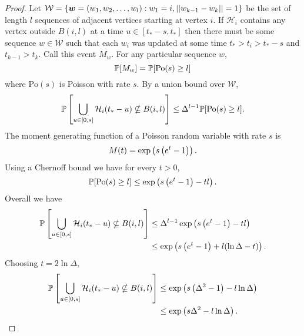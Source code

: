 		\begin{proof}
			Let $\mathcal{W} = \{{\bm{{w}}} = (w_1, w_2, \dots, w_l) : w_1 = i, ||w_{k-1} - w_k|| = 1\}$ be the set of length $l$ sequences of adjacent vertices starting at vertex $i$. If $\mathcal{H}_i$ contains any vertex outside $B(i, l)$ at a time $u \in [t_* - s, t_*]$ then there must be some sequence $w \in \mathcal{W}$ such that each $w_i$ was updated at some time $t_* > t_i > t_* - s$ and $t_{k-1} > t_k$. Call this event $M_w$. For any particular sequence $w$,
			\begin{equation}
				\mathbb{P}[M_w] = \mathbb{P}[\mathrm{Po}(s) \geq l]
			\end{equation}
			where $\mathrm{Po}(s)$ is Poisson with rate $s$. By a union bound over $\mathcal{W}$,
			\begin{equation}
				\mathbb{P}\left[\bigcup_{u \in [0, s]}\mathcal{H}_i(t_* - u) \nsubseteq B(i, l)\right] \leq \Delta^{l-1} \mathbb{P}[\mathrm{Po}(s) \geq l].
			\end{equation}
			The moment generating function of a Poisson random variable with rate $s$ is
			\begin{equation}
				M(t) = \exp\left(s\left(e^t - 1\right)\right).
			\end{equation}
			Using a Chernoff bound we have for every $t > 0$,
			\begin{equation}
				\mathbb{P}[\mathrm{Po}(s) \geq l] \leq \exp\left(s\left(e^t - 1\right) - t l\right).
			\end{equation}
			Overall we have
			\begin{align}
				\mathbb{P}\left[\bigcup_{u \in [0, s]}\mathcal{H}_i(t_* - u) \nsubseteq B(i, l)\right] &\leq \Delta^{l-1} \exp\left(s\left(e^t - 1\right) - t l\right)\\
				&\leq \exp\left(s\left(e^t - 1\right) + l (\ln \Delta - t) \right).
			\end{align}
			Choosing $t = 2 \ln \Delta$,
			\begin{align}
				\mathbb{P}\left[\bigcup_{u \in [0, s]}\mathcal{H}_i(t_* - u) \nsubseteq B(i, l)\right] &\leq \exp\left(s\left(\Delta^2 - 1\right) - l \ln \Delta \right)\\
				&\leq \exp\left(s \Delta^2 - l \ln \Delta \right).
			\end{align}
		\end{proof}



